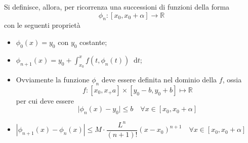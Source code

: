 \documentclass[a4paper]{extarticle}
\newcommand*\dif{\mathop{}\!\mathrm{d}}
\begin{document}
\vspace{1em}
\noindent
Si definisce, allora, per ricorrenza una successioni di funzioni della forma
\[\phi_n : [x_0,x_0+\alpha] \rightarrow \mathbb{R}\]
con le seguenti proprietà
\begin{itemize}
    \item $\phi_0(x)=y_0$ con $y_0$ costante;
    \item $\displaystyle{\phi_{n+1}(x) = y_0 + \int_{x_0}^x f(t,\phi_n(t)) \dif t}$;
    \item Ovviamente la funzione $\phi_n$ deve essere definita nel dominio della $f$, ossia
    \[f : \left[x_0,x_+a\right] \times \left[y_0-b,y_0+b\right] \longmapsto \mathbb{R}\]
    per cui deve essere
    \[\vert \phi_n(x) - y_0 \vert \leq b \hspace{1em} \forall x \in \left[x_0,x_0+\alpha\right]\]
    \item $\displaystyle{\left\vert \phi_{n+1}(x) - \phi_n(x)\right\vert \leq M \cdot \dfrac{L^n}{(n+1)!} (x-x_0)^{n+1} \hspace{1em} \forall x \in [x_0,x_0+\alpha]}$
\end{itemize}
\end{document}
